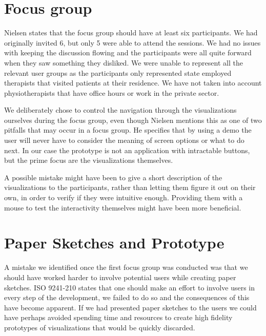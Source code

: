 \section{Focus group}
Nielsen states that the focus group should have at least six participants. We had originally invited 6, but only 5 were able to attend the sessions. We had no issues with keeping the discussion flowing and the participants were all quite forward when they saw something they disliked. We were unable to represent all the relevant user groups as the participants only represented state employed therapists that visited patients at their residence. We have not taken into account physiotherapists that have office hours or work in the private sector.

We deliberately chose to control the navigation through the visualizations ourselves during the focus group, even though Nielsen mentions this as one of two pitfalls that may occur in a focus group. He specifies that by using a demo the user will never have to consider the meaning of screen options or what to do next. In our case the prototype is not an application with intractable buttons, but the prime focus are the visualizations themselves. 

A possible mistake might have been to give a short description of the visualizations to the participants, rather than letting them figure it out on their own, in order to verify if they were intuitive enough. Providing them with a mouse to test the interactivity themselves might have been more beneficial.

\section{Paper Sketches and Prototype}
A mistake we identified once the first focus group was conducted was that we should have worked harder to involve potential users while creating paper sketches. ISO 9241-210 states that one should make an effort to involve users in every step of the development, we failed to do so and the consequences of this have become apparent. If we had presented paper sketches to the users we could have perhaps avoided spending time and resources to create high fidelity prototypes of visualizations that would be quickly discarded.
